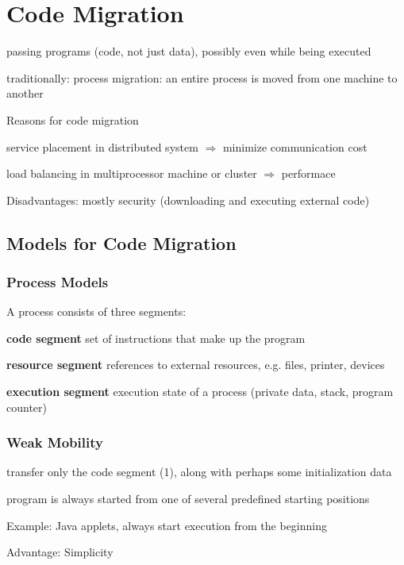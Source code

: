 \section{Code Migration}

\begin{compactitem}
	\item passing programs (code, not just data), possibly even while being executed
	\item traditionally: process migration: an entire process is moved from one machine to another
	\item Reasons for code migration
	\begin{compactitem}
		\item service placement in distributed system $\Rightarrow$ minimize communication cost
		\item load balancing in multiprocessor machine or cluster $\Rightarrow$ performace
	\end{compactitem}
	\item Disadvantages: mostly security (downloading and executing external code)
\end{compactitem}


\subsection{Models for Code Migration}

\subsubsection{Process Models}

A process consists of three segments:
\begin{compactenum}
	\item \textbf{code segment} set of instructions that make up the program
	\item \textbf{resource segment} references to external resources, e.g. files, printer, devices
	\item \textbf{execution segment} execution state of a process (private data, stack, program counter)
\end{compactenum}

\subsubsection{Weak Mobility}

\begin{compactitem}
	\item transfer only the code segment (1), along with perhaps some initialization data
	\item program is always started from one of several predefined starting positions
	\item Example: Java applets, always start execution from the beginning
	\item Advantage: Simplicity
\end{compactitem}

